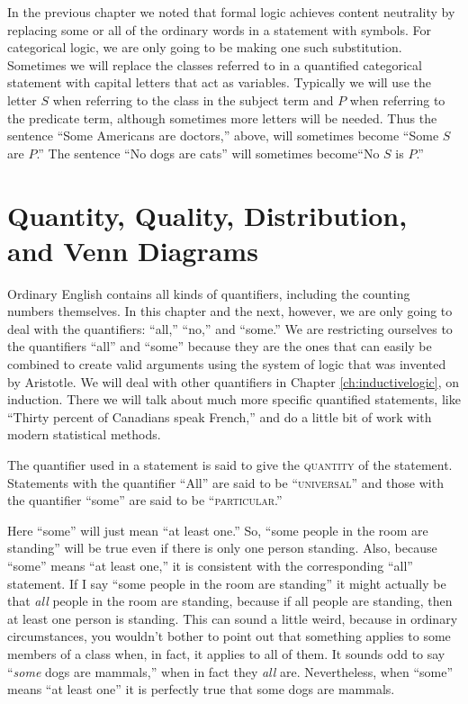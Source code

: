 In the previous chapter we noted that formal logic achieves content neutrality by replacing some or all of the ordinary words in a statement with symbols. For categorical logic, we are only going to be making one such substitution. Sometimes we will replace the classes referred to in a quantified categorical statement with capital letters that act as variables. Typically we will use the letter $S$ when referring to the class in the subject term and $P$ when referring to the predicate term, although sometimes more letters will be needed. Thus the sentence ``Some Americans are doctors,'' above, will sometimes become ``Some $S$ are $P$.'' The sentence ``No dogs are cats'' will sometimes become``No $S$ is $P$.''

\section{Quantity, Quality, Distribution, and Venn Diagrams}\label{sec:QQDVD}

Ordinary English contains all kinds of quantifiers, including the counting numbers themselves. In this chapter and the next, however, we are only going to deal with the quantifiers: ``all,'' ``no,'' and ``some.'' We are restricting ourselves to the quantifiers ``all'' and ``some'' because they are the ones that can easily be combined to create valid arguments using the system of logic that was invented by Aristotle. We will deal with other quantifiers in Chapter \ref{ch:inductivelogic}, on induction. There we will talk about much more specific quantified statements, like ``Thirty percent of Canadians speak French,'' and do a little bit of work with modern statistical methods.

The quantifier used in a statement is said to give the \textsc{\gls{quantity}} \label{def:Quantity} of the statement. Statements with the quantifier ``All'' are said to be ``\textsc{\gls{universal}}'' and those with the quantifier ``some'' are said to be ``\textsc{\gls{particular}}.''

Here ``some'' will just mean ``at least one.'' So, ``some people in the room are standing'' will be true even if there is only one person standing. Also, because ``some'' means ``at least one,'' it is consistent with the corresponding ``all'' statement. If I say ``some people in the room are standing'' it might actually be that \emph{all} people in the room are standing, because if all people are standing, then at least one person is standing. This can sound a little weird, because in ordinary circumstances, you wouldn't bother to point out that something applies to some members of a class when, in fact, it applies to all of them. It sounds odd to say ``\emph{some} dogs are mammals,'' when in fact they \emph{all} are. Nevertheless, when ``some'' means ``at least one'' it is perfectly true that some dogs are mammals.


